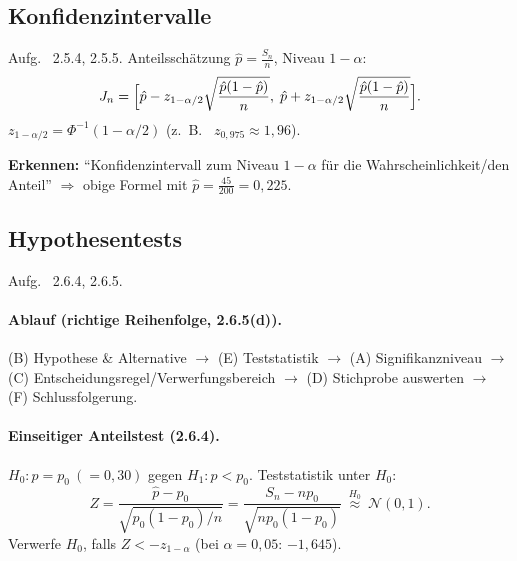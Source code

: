 
\subsection{Konfidenzintervalle}\label{subsec:konfidenzintervalle}
Aufg. \ 2.5.4, 2.5.5. Anteilsschätzung $\hat p=\frac{S_n}{n}$, Niveau $1-\alpha$:
\[
    J_n=\Bigl[\hat p - z_{1-\alpha/2}\sqrt{\frac{\hat p(1-\hat p)}{n}},\;
    \hat p + z_{1-\alpha/2}\sqrt{\frac{\hat p(1-\hat p)}{n}}\Bigr]. 
\]
$z_{1-\alpha/2}=\Phi^{-1}(1-\alpha/2)$ (z. \,B. \ $z_{0{,}975}\approx1{,}96$). 
\begin{reg}
    \textbf{Erkennen:} ``Konfidenzintervall zum Niveau $1-\alpha$
    für die Wahrscheinlichkeit/den Anteil'' $\Rightarrow$ obige Formel mit
    $\hat p=\frac{45}{200}=0{,}225$. 
\end{reg}


\subsection{Hypothesentests}\label{subsec:hypothesentests}
Aufg. \ 2.6.4, 2.6.5. 

\paragraph{Ablauf (richtige Reihenfolge, 2.6.5(d)). }
(B) Hypothese \& Alternative $\to$ (E) Teststatistik $\to$ (A) Signifikanzniveau
$\to$ (C) Entscheidungsregel/Verwerfungsbereich $\to$ (D) Stichprobe auswerten
$\to$ (F) Schlussfolgerung. 

\paragraph{Einseitiger Anteilstest (2.6.4). }
$H_0: p=p_0\ (=0{,}30)$ gegen $H_1: p<p_0$. Teststatistik unter $H_0$:
\[
    Z=\frac{\hat p-p_0}{\sqrt{p_0(1-p_0)/n}}
    =\frac{S_n-np_0}{\sqrt{np_0(1-p_0)}}\ \overset{H_0}{\approx}\ \mathcal N(0,1). 
\]
Verwerfe $H_0$, falls $Z<-z_{1-\alpha}$ (bei $\alpha=0{,}05$: $-1{,}645$). 

